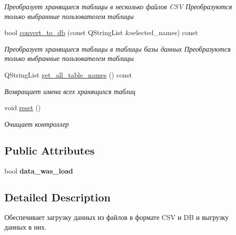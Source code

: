 \begin{DoxyCompactItemize}
\begin{DoxyCompactList}\small\item\em Преобразует хранящиеся таблицы в несколько файлов C\+SV Преобразуются только выбранные пользователем таблицы \end{DoxyCompactList}\item 
bool \mbox{\hyperlink{class_controller_a1a767cfe7fa199f78b3043f4cd637c76}{convert\+\_\+to\+\_\+db}} (const Q\+String\+List \&selected\+\_\+names) const
\begin{DoxyCompactList}\small\item\em Преобразует хранящиеся таблицы в таблицы базы данных Преобразуются только выбранные пользователем таблицы \end{DoxyCompactList}\item 
Q\+String\+List \mbox{\hyperlink{class_controller_af413760ea8c755a4bff82ff5f070ba17}{get\+\_\+all\+\_\+table\+\_\+names}} () const
\begin{DoxyCompactList}\small\item\em Возвращает имена всех хранящихся таблиц \end{DoxyCompactList}\item 
\mbox{\label{class_controller_ab5515748f1b0c82f015e039c817ee5f7}} 
void \mbox{\hyperlink{class_controller_ab5515748f1b0c82f015e039c817ee5f7}{reset}} ()
\begin{DoxyCompactList}\small\item\em Очищает контроллер \end{DoxyCompactList}\end{DoxyCompactItemize}
\subsection*{Public Attributes}
\begin{DoxyCompactItemize}
\item 
\mbox{\label{class_controller_a16e38246321380621fe90b0a0ece1ef4}} 
bool {\bfseries data\+\_\+was\+\_\+load}
\end{DoxyCompactItemize}


\subsection{Detailed Description}
Обеспечивает загрузку данных из файлов в формате C\+SV и DB и выгрузку данных в них. 

